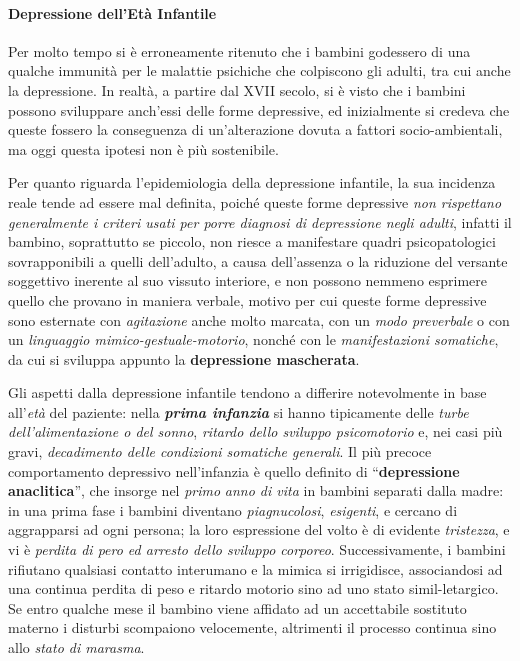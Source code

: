 \paragraph{Depressione dell'Età Infantile}

Per molto tempo si è erroneamente ritenuto che i bambini godessero di
una qualche immunità per le malattie psichiche che colpiscono gli
adulti, tra cui anche la depressione. In realtà, a partire dal XVII
secolo, si è visto che i bambini possono sviluppare anch'essi delle
forme depressive, ed inizialmente si credeva che queste fossero la
conseguenza di un'alterazione dovuta a fattori socio-ambientali, ma oggi
questa ipotesi non è più sostenibile.

Per quanto riguarda l'epidemiologia della depressione infantile, la sua
incidenza reale tende ad essere mal definita, poiché queste forme
depressive \emph{non rispettano generalmente i criteri usati per porre
diagnosi di depressione negli adulti}, infatti il bambino, soprattutto
se piccolo, non riesce a manifestare quadri psicopatologici
sovrapponibili a quelli dell'adulto, a causa dell'assenza o la riduzione
del versante soggettivo inerente al suo vissuto interiore, e non possono
nemmeno esprimere quello che provano in maniera verbale, motivo per cui
queste forme depressive sono esternate con \emph{agitazione} anche molto
marcata, con un \emph{modo preverbale} o con un \emph{linguaggio
mimico-gestuale-motorio}, nonché con le \emph{manifestazioni somatiche},
da cui si sviluppa appunto la \textbf{depressione mascherata}.

Gli aspetti dalla depressione infantile tendono a differire notevolmente
in base all'\emph{età} del paziente: nella \textbf{\emph{prima
infanzia}} si hanno tipicamente delle \emph{turbe dell'alimentazione o
del sonno}, \emph{ritardo dello sviluppo psicomotorio} e, nei casi più
gravi, \emph{decadimento delle condizioni somatiche generali}. Il più
precoce comportamento depressivo nell'infanzia è quello definito di
``\textbf{depressione anaclitica}'', che insorge nel \emph{primo}
\emph{anno di vita} in bambini separati dalla madre: in una prima fase i
bambini diventano \emph{piagnucolosi}, \emph{esigenti}, e cercano di
aggrapparsi ad ogni persona; la loro espressione del volto è di evidente
\emph{tristezza}, e vi è \emph{perdita di pero ed arresto dello sviluppo
corporeo}. Successivamente, i bambini rifiutano qualsiasi contatto
interumano e la mimica si irrigidisce, associandosi ad una continua
perdita di peso e ritardo motorio sino ad uno stato simil-letargico. Se
entro qualche mese il bambino viene affidato ad un accettabile sostituto
materno i disturbi scompaiono velocemente, altrimenti il processo
continua sino allo \emph{stato di marasma}.

